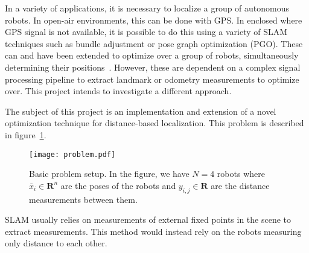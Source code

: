 In a variety of applications, it is necessary to localize a group of autonomous robots. In open-air environments, this can be done with GPS. In enclosed where GPS signal is not available, it is possible to do this using a variety of SLAM techniques such as bundle adjustment or pose graph optimization (PGO). These can and have been extended to optimize over a group of robots, simultaneously determining their positions~\cite{SLAM_distributed}. However, these are dependent on a complex signal processing pipeline to extract landmark or odometry measurements to optimize over. This project intends to investigate a different approach. 

The subject of this project is an implementation and extension of a novel optimization technique for distance-based localization. This problem is described in figure~\ref{fig:problem_desc}.
\begin{figure}[ht]
    \centering
    \texttt{[image: problem.pdf]}
    \caption{Basic problem setup. In the figure, we have $N=4$ robots where $\bar{x}_i\in \mathbf{R}^n$ are the poses of the robots and $y_{i,j} \in \mathbf{R}$ are the distance measurements between them. }
    \label{fig:problem_desc}
\end{figure}
SLAM usually relies on measurements of external fixed points in the scene to extract measurements. This method would instead rely on the robots measuring only distance to each other. 
